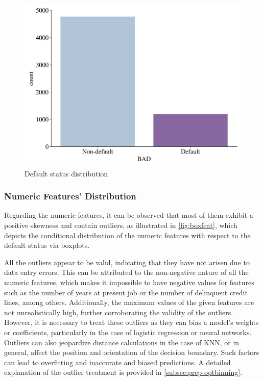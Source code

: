 \begin{figure}[H]
\centering
\caption{Default status distribution}
\label{fig:defaultdist}
\includegraphics[width=130mm]{Figures/Default_Distribution.jpg}\vspace{-1em}
\vspace{-1em}
\end{figure}

\subsubsection{Numeric Features' Distribution}
\label{subsubsec:numdist}

Regarding the numeric features, it can be observed that most of them exhibit a positive skewness and contain outliers, as illustrated in \autoref{fig:boxfeat}, which depicts the conditional distribution of the numeric features with respect to the default status via boxplots.

All the outliers appear to be valid, indicating that they have not arisen due to data entry errors.
This can be attributed to the non-negative nature of all the numeric features, which makes it impossible to have negative values for features such as the number of years at present job or the number of delinquent credit lines, among others.
Additionally, the maximum values of the given features are not unrealistically high, further corroborating the validity of the outliers.
However, it is necessary to treat these outliers as they can bias a model's weights or coefficients, particularly in the case of logistic regression or neural networks.
Outliers can also jeopardize distance calculations in the case of KNN, or in general, affect the position and orientation of the decision boundary.
Such factors can lead to overfitting and inaccurate and biased predictions.
A detailed explanation of the outlier treatment is provided in \autoref{subsec:prep-optbinning}.

